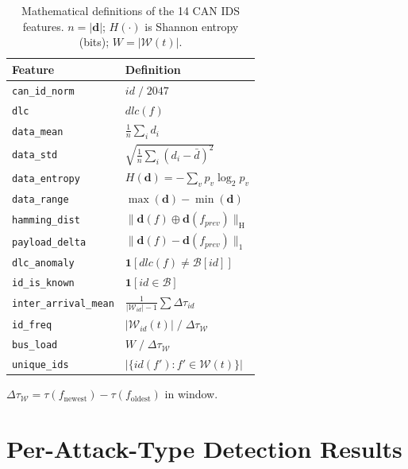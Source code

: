 \begin{table}[t]
\caption{Mathematical definitions of the 14 CAN IDS features. $n = |\mathbf{d}|$; $H(\cdot)$ is Shannon entropy (bits); $W = |\mathcal{W}(t)|$.}
\label{tab:feature_math}
\small
\begin{tabular}{@{}ll@{}}
\toprule
\textbf{Feature} & \textbf{Definition} \\
\midrule
\texttt{can\_id\_norm}        & $\textit{id}\;/\;2047$ \\
\texttt{dlc}                  & $\textit{dlc}(f)$ \\
\texttt{data\_mean}           & $\frac{1}{n}\sum_i d_i$ \\
\texttt{data\_std}            & $\sqrt{\frac{1}{n}\sum_i(d_i - \bar{d})^2}$ \\
\texttt{data\_entropy}        & $H(\mathbf{d}) = -\sum_v p_v \log_2 p_v$ \\
\texttt{data\_range}          & $\max(\mathbf{d}) - \min(\mathbf{d})$ \\
\texttt{hamming\_dist}        & $\|\mathbf{d}(f) \oplus \mathbf{d}(f_{\textit{prev}})\|_{\mathrm{H}}$ \\
\texttt{payload\_delta}       & $\|\mathbf{d}(f) - \mathbf{d}(f_{\textit{prev}})\|_1$ \\
\texttt{dlc\_anomaly}         & $\mathbf{1}[\textit{dlc}(f) \neq \mathcal{B}[\textit{id}]]$ \\
\texttt{id\_is\_known}        & $\mathbf{1}[\textit{id} \in \mathcal{B}]$ \\
\texttt{inter\_arrival\_mean} & $\frac{1}{|\mathcal{W}_{\textit{id}}|-1}\sum \Delta\tau_{\textit{id}}$ \\
\texttt{id\_freq}             & $|\mathcal{W}_{\textit{id}}(t)|\;/\;\Delta\tau_{\mathcal{W}}$ \\
\texttt{bus\_load}            & $W\;/\;\Delta\tau_{\mathcal{W}}$ \\
\texttt{unique\_ids}          & $|\{\textit{id}(f') : f' \in \mathcal{W}(t)\}|$ \\
\bottomrule
\end{tabular}

\smallskip\footnotesize{$\Delta\tau_{\mathcal{W}} = \tau(f_{\text{newest}}) - \tau(f_{\text{oldest}})$ in window.}
\end{table}

\section{Per-Attack-Type Detection Results}
\label{app:per_attack}

